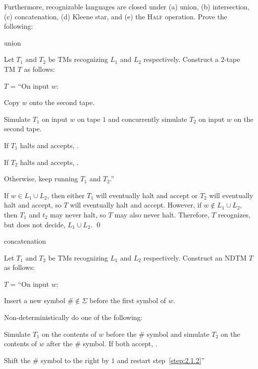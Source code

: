 \def \half {\textsc{Half }}
\begin{problem}
  Furthermore, recognizable languages are closed under (a) union,
  (b) intersection, (c) concatenation, (d) Kleene star, and
  (e) the \half operation. Prove the following:
  \begin{enumalph}
    \item union
    \begin{Answer}
      Let $T_1$ and $T_2$ be TMs recognizing $L_1$ and $L_2$ respectively.
      Construct a $2$-tape TM $T$ as follows:

      \step
      $T$ = ``On input $w$:
        \begin{enumarabic}
          \item Copy $w$ onto the second tape.
          \item Simulate $T_1$ on input $w$ on tape $1$
            and concurrently simulate $T_2$ on input $w$ on the second tape.
          \item If $T_1$ halts and accepts, \Accept.
          \item If $T_2$ halts and accepts, \Accept.
          \item Otherwise, keep running $T_1$ and $T_2$.''
        \end{enumarabic}

        \step
        If $w \in L_1 \cup L_2$, then either $T_1$ will eventually halt
        and accept or $T_2$ will eventually halt and accept,
        so $T$ will eventually halt and accept.
        However, if $w \notin L_1 \cup L_2$, then $T_1$ and $t_2$ may
        never halt, so $T$ may also never halt.
        Therefore, $T$ recognizes, but does not decide, $L_1 \cup L_2$.  \qed
    \end{Answer}

    \newpage
    \setcounter{enumi}{2}
    \item concatenation
    \begin{Answer}
      Let $T_1$ and $T_2$ be TMs recognizing $L_1$ and $L_2$ respectively.
      Construct an NDTM $T$ as follows:

      \step
      $T$ = ``On input $w$:
        \begin{enumarabic}
          \item Insert a new symbol $\# \notin \Sigma$ before the first
            symbol of $w$.
          \item Non-deterministically do one of the following:~\label{step:2.1.2}
            \begin{enumarabic*}
              \item Simulate $T_1$ on the contents of $w$ before the $\#$
                symbol and simulate $T_2$ on the contents of $w$ after
                the $\#$ symbol. If both accept, \Accept.
              \item Shift the $\#$ symbol to the right by $1$ and restart
                step~\ref{step:2.1.2}''
            \end{enumarabic*}
        \end{enumarabic}


\end{Answer}
\end{enumalph}
\end{problem}

